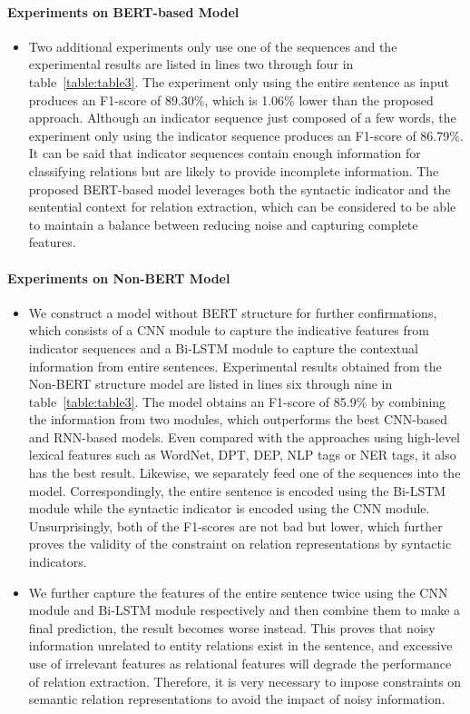 \documentclass[conference]{IEEEtran}
\begin{document}
\paragraph{Experiments on BERT-based Model}
\begin{itemize}
\item  Two additional experiments only use one of the sequences and the experimental results are listed in lines two through four in table~\ref{table:table3}. The experiment only using the entire sentence as input produces an F1-score of 89.30\%, which is 1.06\% lower than the proposed approach. Although an indicator sequence just composed of a few words, the experiment only using the indicator sequence produces an F1-score of 86.79\%. It can be said that indicator sequences contain enough information for classifying relations but are likely to provide incomplete information. The proposed BERT-based model leverages both the syntactic indicator and the sentential context for relation extraction, which can be considered to be able to maintain a balance between reducing noise and capturing complete features.
\end{itemize}

\paragraph{Experiments on Non-BERT Model}
\begin{itemize}
\item We construct a model without BERT structure for further confirmations, which consists of a CNN module to capture the indicative features from indicator sequences and a Bi-LSTM module to capture the contextual information from entire sentences. Experimental results obtained from the Non-BERT structure model are listed in lines six through nine in table~\ref{table:table3}. The model obtains an F1-score of 85.9\% by combining the information from two modules, which outperforms the best CNN-based and RNN-based models. Even compared with the approaches using high-level lexical features such as WordNet, DPT, DEP, NLP tags or NER tags, it also has the best result. Likewise, we separately feed one of the sequences into the model. Correspondingly, the entire sentence is encoded using the Bi-LSTM module while the syntactic indicator is encoded using the CNN module. Unsurprisingly, both of the F1-scores are not bad but lower, which further proves the validity of the constraint on relation representations by syntactic indicators.
\item We further capture the features of the entire sentence twice using the CNN module and Bi-LSTM module respectively and then combine them to make a final prediction, the result becomes worse instead. This proves that noisy information unrelated to entity relations exist in the sentence, and excessive use of irrelevant features as relational features will degrade the performance of relation extraction. Therefore, it is very necessary to impose constraints on semantic relation representations to avoid the impact of noisy information.
\end{itemize}
\end{document}
